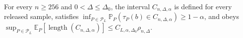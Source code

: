 For every \(n\geq256\) and \(0<\Delta\leq\Delta_0\), the interval \(C_{n,\Delta,\alpha}\) is defined for every released sample, satisfies \(\inf_{P\in\mathcal P_L}\mathbb P_P(\tau_P(b)\in C_{n,\Delta,\alpha})\geq1-\alpha\), and obeys \(\sup_{P\in\mathcal P_L}\mathbb E_P[\operatorname{length}(C_{n,\Delta,\alpha})]\leq C_{L,\alpha,\Delta_0}\rho_{n,\Delta}\).